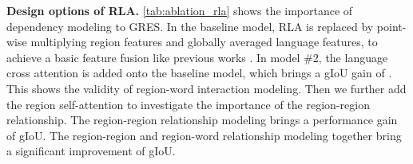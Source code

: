 \documentclass[10pt,twocolumn,letterpaper]{article}
\begin{document}
\begin{table}[t]
\renewcommand\arraystretch{1.0}
\centering
\footnotesize
\caption{Ablation study of RLA design options.}
 \vspace{-3.6mm}
\centering
\label{tab:ablation_rla}
\vspace{-0.12in}
\end{table}

\textbf{Design options of RLA.} \cref{tab:ablation_rla} shows the importance of dependency modeling to GRES. 
In the baseline model, RLA is replaced by point-wise multiplying region features and globally averaged language features, to achieve a basic feature fusion like previous works \cite{ding2021vision, luo2020multi}. In model \#2, the language cross attention is added onto the baseline model, which brings a gIoU gain of . This shows the validity of region-word interaction modeling. Then we further add the region self-attention to investigate the importance of the region-region relationship. The region-region relationship modeling brings a performance gain of  gIoU. The region-region and region-word relationship modeling together bring a significant improvement of  gIoU.

\begin{table}[t]
\renewcommand\arraystretch{1.0}
\centering
\footnotesize
\caption{Ablation study of Number of Regions}
\vspace{-3.6mm}
\centering
\label{tab:ablation_q}
\end{table}
\end{document}
